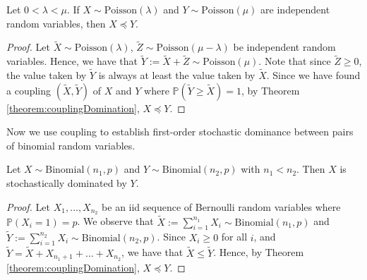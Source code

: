 \begin{theorem}
	Let $0 < \lambda < \mu$. If $X \sim \text{Poisson}(\lambda)$ and $Y \sim \text{Poisson}(\mu)$ are independent random variables, then $X \preceq Y$. 
\end{theorem}

\begin{proof}
	Let $\tilde{X} \sim \text{Poisson}(\lambda)$, $\tilde{Z} \sim \text{Poisson}(\mu - \lambda)$ be independent random variables. Hence, we have that $\tilde{Y} := \tilde{X} + \tilde{Z} \sim \text{Poisson}(\mu)$. Note that since $\tilde{Z} \geq 0$, the value taken by $\tilde{Y}$ is always at least the value taken by $\tilde{X}$. Since we have found a coupling $(\tilde{X}, \tilde{Y})$ of $X$ and $Y$ where $\mathbb{P}(\tilde{Y} \geq \tilde{X}) = 1$, by Theorem \ref{theorem:couplingDomination}, $X \preceq Y$.
\end{proof}

Now we use coupling to establish first-order stochastic dominance between pairs of binomial random variables.

\begin{theorem}
	Let $X \sim \text{Binomial}(n_1, p)$ and $Y \sim \text{Binomial}(n_2, p)$ with $n_1 < n_2$. Then $X$ is stochastically dominated by $Y$.
\end{theorem}

\begin{proof}
	Let $X_1, \dots, X_{n_2}$ be an iid sequence of Bernoulli random variables where $\mathbb{P}(X_i = 1) = p$. We observe that $\tilde{X} := \sum_{i=1}^{n_1} X_i \sim \text{Binomial}(n_1, p)$ and $\tilde{Y} := \sum_{i=1}^{n_2} X_i \sim \text{Binomial}(n_2, p)$. Since $X_i \geq 0$ for all $i$, and $\tilde{Y} = \tilde{X} + X_{n_1 + 1} + \dots + X_{n_2}$, we have that $\tilde{X} \leq \tilde{Y}$. Hence, by Theorem \ref{theorem:couplingDomination}, $X \preceq Y$.
\end{proof}


